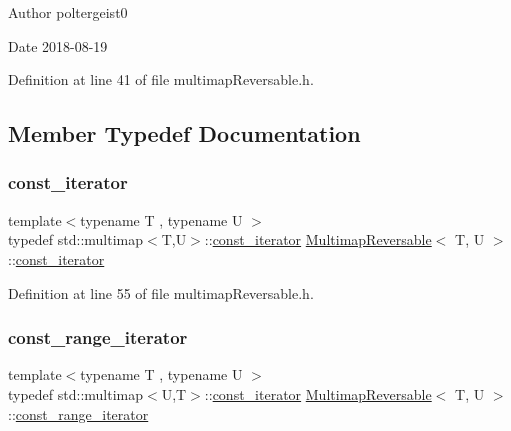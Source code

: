 \begin{DoxyAuthor}{Author}
poltergeist0
\end{DoxyAuthor}
\begin{DoxyDate}{Date}
2018-\/08-\/19 
\end{DoxyDate}


Definition at line 41 of file multimap\+Reversable.\+h.



\subsection{Member Typedef Documentation}
\mbox{\label{classMultimapReversable_ac747a36aa9a030bec3d2149d97047de5}} 
\subsubsection{\texorpdfstring{const\+\_\+iterator}{const\_iterator}}
{\footnotesize\ttfamily template$<$typename T , typename U $>$ \\
typedef std\+::multimap$<$T,U$>$\+::\hyperlink{classMultimapReversable_ac747a36aa9a030bec3d2149d97047de5}{const\+\_\+iterator} \hyperlink{classMultimapReversable}{Multimap\+Reversable}$<$ T, U $>$\+::\hyperlink{classMultimapReversable_ac747a36aa9a030bec3d2149d97047de5}{const\+\_\+iterator}}



Definition at line 55 of file multimap\+Reversable.\+h.

\mbox{\label{classMultimapReversable_ae87bcf568586e240e0d294050fa248cb}} 
\subsubsection{\texorpdfstring{const\+\_\+range\+\_\+iterator}{const\_range\_iterator}}
{\footnotesize\ttfamily template$<$typename T , typename U $>$ \\
typedef std\+::multimap$<$U,T$>$\+::\hyperlink{classMultimapReversable_ac747a36aa9a030bec3d2149d97047de5}{const\+\_\+iterator} \hyperlink{classMultimapReversable}{Multimap\+Reversable}$<$ T, U $>$\+::\hyperlink{classMultimapReversable_ae87bcf568586e240e0d294050fa248cb}{const\+\_\+range\+\_\+iterator}}



